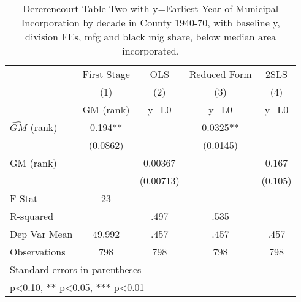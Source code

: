\begin{table}[htbp]\centering
\def\sym#1{\ifmmode^{#1}\else\(^{#1}\)\fi}
\caption{Dererencourt Table Two with y=Earliest Year of Municipal Incorporation by decade in County 1940-70, with baseline y, division FEs, mfg and black mig share, below median area incorporated.}
\begin{tabular}{l*{4}{c}}
\toprule
                    & First Stage   &         OLS   &Reduced Form   &        2SLS   \\
                    &\multicolumn{1}{c}{(1)}&\multicolumn{1}{c}{(2)}&\multicolumn{1}{c}{(3)}&\multicolumn{1}{c}{(4)}\\
                    &\multicolumn{1}{c}{GM  (rank)}&\multicolumn{1}{c}{y\_L0}&\multicolumn{1}{c}{y\_L0}&\multicolumn{1}{c}{y\_L0}\\
\midrule
$\hat{GM}$ (rank)   &       0.194** &               &      0.0325** &               \\
                    &    (0.0862)   &               &    (0.0145)   &               \\
\addlinespace
GM  (rank)          &               &     0.00367   &               &       0.167   \\
                    &               &   (0.00713)   &               &     (0.105)   \\
\midrule
F-Stat              &          23   &               &               &               \\
R-squared           &               &        .497   &        .535   &               \\
Dep Var Mean        &      49.992   &        .457   &        .457   &        .457   \\
Observations        &         798   &         798   &         798   &         798   \\
\bottomrule
\multicolumn{5}{l}{\footnotesize Standard errors in parentheses}\\
\multicolumn{5}{l}{\footnotesize * p<0.10, ** p<0.05, *** p<0.01}\\
\end{tabular}
\end{table}
